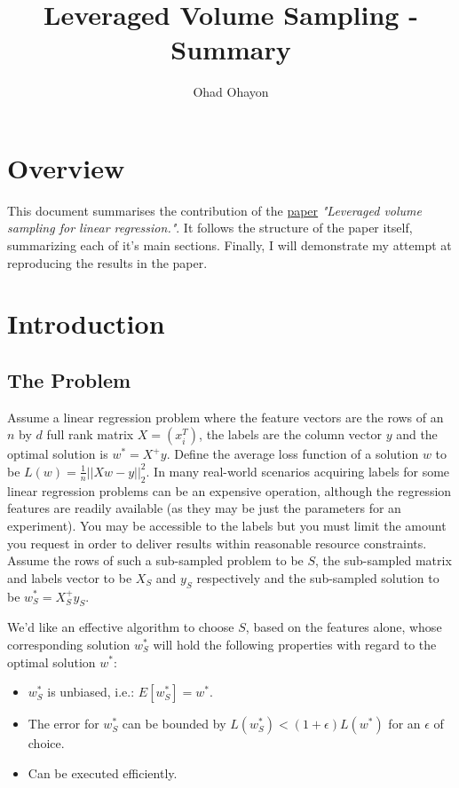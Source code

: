 \documentclass{article}
\begin{document}
	\title{Leveraged Volume Sampling - Summary}
	\author{Ohad Ohayon}
	\maketitle
	\newpage


    \tableofcontents
    \newpage

    \section{Overview}
        This document summarises the contribution of the {\color{blue}\href{https://arxiv.org/abs/1802.06749}{\underline{paper}}} \textit{"Leveraged volume sampling for linear regression."}.
        It follows the structure of the paper itself, summarizing each of it's main sections.
        Finally, I will demonstrate my attempt at reproducing the results in the paper.

    \section{Introduction}
        \subsection{The Problem}
            Assume a linear regression problem where the feature vectors are the rows of an $n$ by $d$ full rank matrix $X=(x_{i}^T)$,
            the labels are the column vector $y$ and the optimal solution is $w^\ast=X^+y$.
            Define the average loss function of a solution $w$ to be $L(w)=\frac{1}{n}||Xw-y||_{2}^2$.
            In many real-world scenarios acquiring labels for some linear regression problems can be an expensive operation,
            although the regression features are readily available (as they may be just the parameters for an experiment).
            You may be accessible to the labels but you must limit the amount you request in order to deliver results within
            reasonable resource constraints.
            Assume the rows of such a sub-sampled problem to be $S$, the sub-sampled matrix and labels vector to be $X_{S}$
            and $y_{S}$ respectively and the sub-sampled solution to be $w_{S}^\ast=X_{S}^+y_{S}$.

            We'd like an effective algorithm to choose $S$, based on the features alone, whose corresponding solution $w_{S}^\ast$
            will hold the following properties with regard to the optimal solution $w^\ast$:
            \begin{itemize}
                \item $w_{S}^\ast$ is unbiased, i.e.: $E[w_{S}^\ast]=w^\ast$.
                \item The error for $w_{S}^\ast$ can be bounded by $L(w_{S}^\ast) < (1+\epsilon)L(w^\ast)$ for an $\epsilon$ of choice.
                \item Can be executed efficiently.
            \end{itemize}
\end{document}
